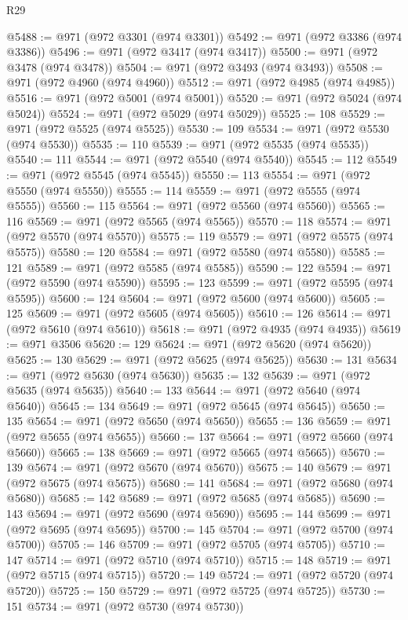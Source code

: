 \begin{lexlean}{R29}
\begin{coremodule}
@5488 := @971 (@972 @3301 (@974 @3301))
@5492 := @971 (@972 @3386 (@974 @3386))
@5496 := @971 (@972 @3417 (@974 @3417))
@5500 := @971 (@972 @3478 (@974 @3478))
@5504 := @971 (@972 @3493 (@974 @3493))
@5508 := @971 (@972 @4960 (@974 @4960))
@5512 := @971 (@972 @4985 (@974 @4985))
@5516 := @971 (@972 @5001 (@974 @5001))
@5520 := @971 (@972 @5024 (@974 @5024))
@5524 := @971 (@972 @5029 (@974 @5029))
@5525 := 108
@5529 := @971 (@972 @5525 (@974 @5525))
@5530 := 109
@5534 := @971 (@972 @5530 (@974 @5530))
@5535 := 110
@5539 := @971 (@972 @5535 (@974 @5535))
@5540 := 111
@5544 := @971 (@972 @5540 (@974 @5540))
@5545 := 112
@5549 := @971 (@972 @5545 (@974 @5545))
@5550 := 113
@5554 := @971 (@972 @5550 (@974 @5550))
@5555 := 114
@5559 := @971 (@972 @5555 (@974 @5555))
@5560 := 115
@5564 := @971 (@972 @5560 (@974 @5560))
@5565 := 116
@5569 := @971 (@972 @5565 (@974 @5565))
@5570 := 118
@5574 := @971 (@972 @5570 (@974 @5570))
@5575 := 119
@5579 := @971 (@972 @5575 (@974 @5575))
@5580 := 120
@5584 := @971 (@972 @5580 (@974 @5580))
@5585 := 121
@5589 := @971 (@972 @5585 (@974 @5585))
@5590 := 122
@5594 := @971 (@972 @5590 (@974 @5590))
@5595 := 123
@5599 := @971 (@972 @5595 (@974 @5595))
@5600 := 124
@5604 := @971 (@972 @5600 (@974 @5600))
@5605 := 125
@5609 := @971 (@972 @5605 (@974 @5605))
@5610 := 126
@5614 := @971 (@972 @5610 (@974 @5610))
@5618 := @971 (@972 @4935 (@974 @4935))
@5619 := @971 @3506
@5620 := 129
@5624 := @971 (@972 @5620 (@974 @5620))
@5625 := 130
@5629 := @971 (@972 @5625 (@974 @5625))
@5630 := 131
@5634 := @971 (@972 @5630 (@974 @5630))
@5635 := 132
@5639 := @971 (@972 @5635 (@974 @5635))
@5640 := 133
@5644 := @971 (@972 @5640 (@974 @5640))
@5645 := 134
@5649 := @971 (@972 @5645 (@974 @5645))
@5650 := 135
@5654 := @971 (@972 @5650 (@974 @5650))
@5655 := 136
@5659 := @971 (@972 @5655 (@974 @5655))
@5660 := 137
@5664 := @971 (@972 @5660 (@974 @5660))
@5665 := 138
@5669 := @971 (@972 @5665 (@974 @5665))
@5670 := 139
@5674 := @971 (@972 @5670 (@974 @5670))
@5675 := 140
@5679 := @971 (@972 @5675 (@974 @5675))
@5680 := 141
@5684 := @971 (@972 @5680 (@974 @5680))
@5685 := 142
@5689 := @971 (@972 @5685 (@974 @5685))
@5690 := 143
@5694 := @971 (@972 @5690 (@974 @5690))
@5695 := 144
@5699 := @971 (@972 @5695 (@974 @5695))
@5700 := 145
@5704 := @971 (@972 @5700 (@974 @5700))
@5705 := 146
@5709 := @971 (@972 @5705 (@974 @5705))
@5710 := 147
@5714 := @971 (@972 @5710 (@974 @5710))
@5715 := 148
@5719 := @971 (@972 @5715 (@974 @5715))
@5720 := 149
@5724 := @971 (@972 @5720 (@974 @5720))
@5725 := 150
@5729 := @971 (@972 @5725 (@974 @5725))
@5730 := 151
@5734 := @971 (@972 @5730 (@974 @5730))

\end{coremodule}
\end{lexlean}
